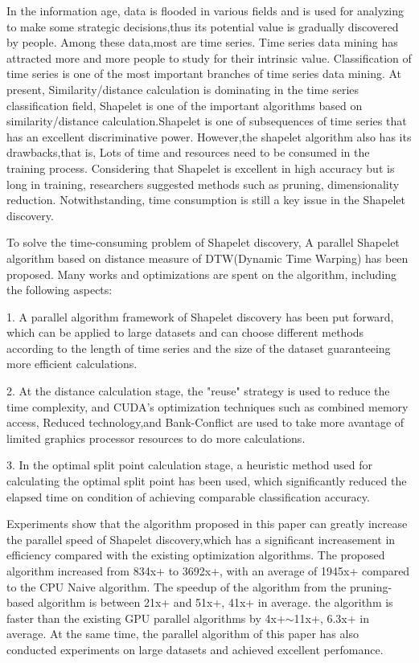 \begin{eabstract}
	
In the information age, data is flooded in various fields and is used for analyzing to make some strategic decisions,thus its potential value is gradually discovered by people. Among these data,most are time series. Time series data mining has attracted more and more people to study for their intrinsic value. Classification of time series is one of the most important branches of time series data mining. At present, Similarity/distance calculation is dominating in the time series classification field, Shapelet is one of the important algorithms based on similarity/distance calculation.Shapelet is one of subsequences of time series that has an excellent discriminative power.
However,the shapelet algorithm also has its drawbacks,that is, Lots of time and resources need to be consumed in the training process. Considering that Shapelet is excellent in high accuracy but is long in training, researchers suggested methods such as pruning, dimensionality reduction. Notwithstanding, time consumption is still a key issue in the Shapelet discovery.

To solve the time-consuming problem of Shapelet discovery, A parallel Shapelet algorithm based on distance measure of DTW(Dynamic Time Warping) has been proposed. Many works and optimizations are spent on the algorithm, including the following aspects:

1. A parallel algorithm framework of Shapelet discovery has been put forward, which can be applied to large datasets and can choose different methods according to the length of time series and the size of the dataset guaranteeing more efficient calculations.

2. At the distance calculation stage, the "reuse" strategy is used to reduce the time complexity, and CUDA's optimization techniques such as combined memory access, Reduced technology,and Bank-Conflict are used to take more avantage of limited graphics processor resources to do more calculations.

3. In the optimal split point calculation stage, a heuristic method used for calculating the optimal split point has been used, which significantly reduced the elapsed time on condition of achieving comparable classification accuracy.

Experiments show that the algorithm proposed in this paper can greatly increase the parallel speed of Shapelet discovery,which has a significant increasement in efficiency compared with the existing optimization algorithms. The proposed algorithm increased from 834x+ to 3692x+, with an average of 1945x+ compared to the CPU Naive algorithm. The speedup of the algorithm from the pruning-based algorithm is between 21x+ and 51x+, 41x+ in average. the algorithm is faster than the existing GPU parallel algorithms by 4x+$\sim$11x+, 6.3x+ in average. At the same time, the parallel algorithm of this paper has also conducted experiments on large datasets and achieved excellent perfomance.
	
\end{eabstract}

